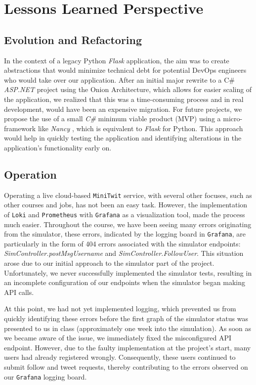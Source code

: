 \chapter{Lessons Learned Perspective}

\section{Evolution and Refactoring}

In the context of a legacy Python \textit{Flask} application, the aim was to create abstractions that would minimize technical debt for potential DevOps engineers who would take over our application. After an initial major rewrite to a C\# \textit{ASP.NET} project using the Onion Architecture, which allows for easier scaling of the application, we realized that this was a time-consuming process and in real development, would have been an expensive migration. For future projects, we propose the use of a small \textit{C\#} minimum viable product (MVP) using a micro-framework like \textit{Nancy} \cite{nancyfx}, which is equivalent to \textit{Flask} for Python. This approach would help in quickly testing the application and identifying alterations in the application's functionality early on.

\section{Operation}

Operating a live cloud-based \texttt{MiniTwit} service, with several other focuses, such as other courses and jobs, has not been an easy task. However, the implementation of \texttt{Loki} and \texttt{Prometheus} with \texttt{Grafana} as a visualization tool, made the process much easier. Throughout the course, we have been seeing many errors originating from the simulator, these errors, indicated by the logging board in \texttt{Grafana}, are particularly in the form of 404 errors associated with the simulator endpoints: \textit{SimController.postMsgUsername} and \textit{SimController.FollowUser}. This situation arose due to our initial approach to the simulator part of the project. Unfortunately, we never successfully implemented the simulator tests, resulting in an incomplete configuration of our endpoints when the simulator began making API calls.

At this point, we had not yet implemented logging, which prevented us from quickly identifying these errors before the first graph of the simulator status was presented to us in class (approximately one week into the simulation). As soon as we became aware of the issue, we immediately fixed the misconfigured API endpoint. However, due to the faulty implementation at the project's start, many users had already registered wrongly. Consequently, these users continued to submit follow and tweet requests, thereby contributing to the errors observed on our \texttt{Grafana} logging board.

